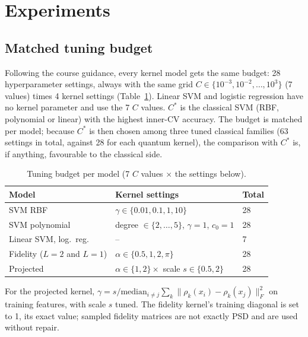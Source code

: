 \documentclass[conference]{IEEEtran}
\begin{document}
\section{Experiments}
\subsection{Matched tuning budget}\label{sec:budget}
Following the course guidance, every kernel model gets the same budget: 28 hyperparameter settings, always with the same grid $C\in\{10^{-3},10^{-2},\dots,10^{3}\}$ (7 values) times 4 kernel settings (Table~\ref{tab:budget}). Linear SVM and logistic regression have no kernel parameter and use the 7 $C$ values. $C^\ast$ is the classical SVM (RBF, polynomial or linear) with the highest inner-CV accuracy. The budget is matched per model; because $C^\ast$ is then chosen among three tuned classical families (63 settings in total, against 28 for each quantum kernel), the comparison with $C^\ast$ is, if anything, favourable to the classical side.

\begin{table}[t]
\centering
\caption{Tuning budget per model (7 $C$ values $\times$ the settings below).}
\label{tab:budget}
\footnotesize
\setlength{\tabcolsep}{4pt}
\begin{tabular}{@{}lll@{}}
\toprule
Model & Kernel settings & Total \\
\midrule
SVM RBF & $\gamma\in\{0.01,0.1,1,10\}$ & 28 \\
SVM polynomial & degree $\in\{2,\dots,5\}$, $\gamma=1$, $c_0=1$ & 28 \\
Linear SVM, log.\ reg. & -- & 7 \\
Fidelity ($L=2$ and $L=1$) & $\alpha\in\{0.5,1,2,\pi\}$ & 28 \\
Projected & $\alpha\in\{1,2\}\times$ scale $s\in\{0.5,2\}$ & 28 \\
\bottomrule
\end{tabular}
\end{table}

For the projected kernel, $\gamma = s/\mathrm{median}_{i\neq j}\sum_k\|\rho_k(x_i)-\rho_k(x_j)\|_F^2$ on training features, with scale $s$ tuned. The fidelity kernel's training diagonal is set to 1, its exact value; sampled fidelity matrices are not exactly PSD and are used without repair.
\end{document}
